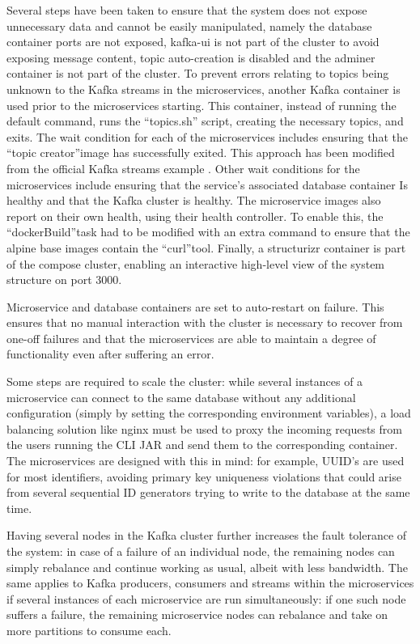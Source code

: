\documentclass[parskip=full]{article}
\begin{document}
    Several steps have been taken to ensure that the system does not expose unnecessary data and cannot be easily manipulated, namely the database container ports are not exposed, kafka-ui is not part of the cluster to avoid exposing message content, topic auto-creation is disabled and the adminer container is not part of the cluster.
    To prevent errors relating to topics being unknown to the Kafka streams in the microservices, another Kafka container is used prior to the microservices starting.
    This container, instead of running the default command, runs the ``topics.sh'' script, creating the necessary topics, and exits.
    The wait condition for each of the microservices includes ensuring that the ``topic creator''image has successfully exited.
    This approach has been modified from the official Kafka streams example \cite{kafkaStreamsExample}.
    Other wait conditions for the microservices include ensuring that the service's associated database container Is healthy and that the Kafka cluster is healthy.
    The microservice images also report on their own health, using their health controller.
    To enable this, the ``dockerBuild''task had to be modified with an extra command to ensure that the alpine base images contain the ``curl''tool.
    Finally, a structurizr container is part of the compose cluster, enabling an interactive high-level view of the system structure on port 3000.

    Microservice and database containers are set to auto-restart on failure.
    This ensures that no manual interaction with the cluster is necessary to recover from one-off failures and that the microservices are able to maintain a degree of functionality even after suffering an error.

    Some steps are required to scale the cluster: while several instances of a microservice can connect to the same database without any additional configuration (simply by setting the corresponding environment variables), a load balancing solution like nginx \cite{nginxProxyPass} must be used to proxy the incoming requests from the users running the CLI JAR and send them to the corresponding container.
    The microservices are designed with this in mind: for example, UUID's are used for most identifiers, avoiding primary key uniqueness violations that could arise from several sequential ID generators trying to write to the database at the same time.

    Having several nodes in the Kafka cluster further increases the fault tolerance of the system: in case of a failure of an individual node, the remaining nodes can simply rebalance and continue working as usual, albeit with less bandwidth.
    The same applies to Kafka producers, consumers and streams within the microservices if several instances of each microservice are run simultaneously: if one such node suffers a failure, the remaining microservice nodes can rebalance and take on more partitions to consume each.
\end{document}
